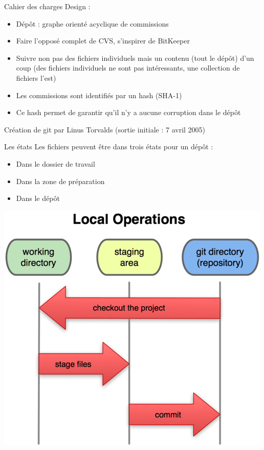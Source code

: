 \begin{frame}{Cahier des charges}
Design : 
\begin{itemize}
	\item Dépôt : graphe orienté acyclique de commissions
	\item Faire l'opposé complet de CVS, s'inspirer de BitKeeper
	\item Suivre non pas des fichiers individuels mais un contenu (tout le dépôt) d'un coup (des fichiers individuels ne sont pas intéressants, une collection de fichiers l'est)
	\item Les commissions sont identifiés par un hash (SHA-1)
	\item Ce hash permet de garantir qu'il n'y a aucune corruption dans le dépôt
\end{itemize}

Création de git par Linus Torvalds (sortie initiale : 7 avril 2005)
\end{frame}

\begin{frame}{Les états}
Les fichiers peuvent être dans trois états pour un dépôt :
\begin{itemize}
	\item Dans le dossier de travail
	\item Dans la zone de préparation
	\item Dans le dépôt
\end{itemize}
\begin{center}
\includegraphics[scale=0.3]{18333fig0106-tn.png}
\end{center}
\end{frame}

